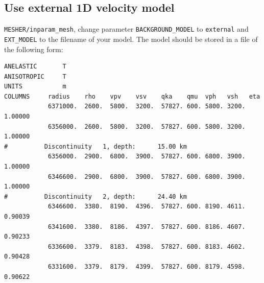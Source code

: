 \documentclass{article}
\begin{document}
\subsection{Use external 1D velocity model}

\verb|MESHER/inparam_mesh|, change parameter \verb|BACKGROUND_MODEL| to \verb|external|
and \verb|EXT_MODEL| to the filename of your model. The model should be stored in a file
of the following form:

\begin{verbatim}
ANELASTIC       T
ANISOTROPIC     T
UNITS           m
COLUMNS     radius    rho    vpv    vsv    qka    qmu  vph   vsh   eta
            6371000.  2600.  5800.  3200.  57827. 600. 5800. 3200. 1.00000
            6356000.  2600.  5800.  3200.  57827. 600. 5800. 3200. 1.00000
#          Discontinuity   1, depth:      15.00 km
            6356000.  2900.  6800.  3900.  57827. 600. 6800. 3900. 1.00000
            6346600.  2900.  6800.  3900.  57827. 600. 6800. 3900. 1.00000
#          Discontinuity   2, depth:      24.40 km
            6346600.  3380.  8190.  4396.  57827. 600. 8190. 4611. 0.90039
            6341600.  3380.  8186.  4397.  57827. 600. 8186. 4607. 0.90233
            6336600.  3379.  8183.  4398.  57827. 600. 8183. 4602. 0.90428
            6331600.  3379.  8179.  4399.  57827. 600. 8179. 4598. 0.90622

\end{verbatim}
\end{document}
